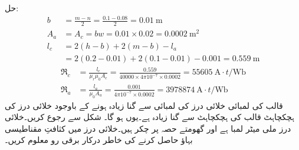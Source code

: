 حل:\quad
\begin{align*}
b&=\frac{m-n}{2}=\frac{0.1-0.08}{2}=\SI{0.01}{\meter}\\
A_a&=A_c=bw=0.01 \times 0.02=\SI{0.0002}{\square \meter}\\
l_c&=2(h-b)+2(m-b)-l_a\\
&=2(0.2-0.01)+2(0.1-0.01)-0.001=\SI{0.559}{\meter}
\end{align*}
%
\begin{align*}
\Re_c&=\frac{l_c}{\mu_r \mu_0 A_c}=\frac{0.559}{40000 \times 4 \pi 10^{-7} \times 0.0002}=\SI{55605}{\ampere \cdot t \per \weber}\\
\Re_a&=\frac{l_a}{\mu_0 A_a}=\frac{0.001}{4 \pi 10^{-7} \times 0.0002}=\SI{3978874}{\ampere \cdot t \per \weber}
\end{align*}
قالب کی لمبائی خلائی درز کی لمبائی سے  گنا زیادہ ہونے کے باوجود خلائی درز کی ہچکچاہٹ قالب کی ہچکچاہٹ سے  گنا زیادہ ہے۔یوں   ہو گا۔
%
شکل   سے رجوع کریں۔خلائی درز  ملی میٹر لمبا ہے اور گھومتے حصہ پر  چکر ہیں۔خلائی درز میں  کثافتِ مقناطیسی بہاؤ حاصل کرنے کی خاطر درکار برقی رو معلوم کریں۔

